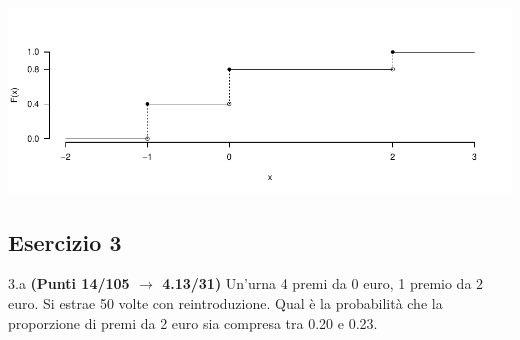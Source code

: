 \documentclass[
  11pt,
]{book}
\theoremstyle{mytheoremstyle}
\theoremstyle{mydefstyle}
\newenvironment{sol}
  {
  \begin{tcolorbox}[enhanced,breakable,arc=0.1mm,boxrule=1pt,colback=white,colframe=iblue,
  title=\bf \fontfamily{lmss}\selectfont \hspace{.5 cm} Soluzione,drop fuzzy shadow]

}{
\end{tcolorbox}
  }
\begin{document}
\begin{sol}

\begin{center}\includegraphics{Esami_passati_con_soluzioni_files/figure-latex/2024-88-1} \end{center}

\end{sol}

\subsection{Esercizio 3}\label{esercizio-3-37}

3.a \textbf{(Punti 14/105 \(\rightarrow\) 4.13/31)} Un'urna 4 premi da \(\mbox{0}\) euro, 1 premio da \(\mbox{2}\) euro.
Si estrae 50 volte con reintroduzione.
Qual è la probabilità che la proporzione di premi da 2 euro sia compresa tra 0.20 e 0.23.
\end{document}
